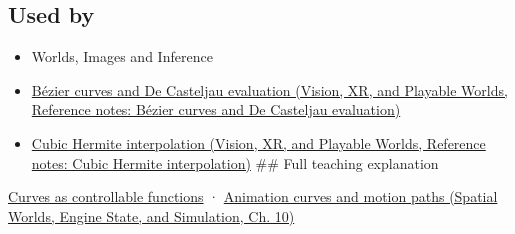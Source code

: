 \subsection{Used by}\label{appendix-f28eeec97a3d-used-by}

\begin{itemize}
\item
  {Worlds, Images and Inference}
\item
  \href{../07-Vision-XR-and-Playable-Worlds/main.pdf\#nameddest=appendix-ddbec701898c}{Bézier curves and De Casteljau evaluation (Vision, XR, and Playable Worlds, Reference notes: Bézier curves and De Casteljau evaluation)}
\item
  \href{../07-Vision-XR-and-Playable-Worlds/main.pdf\#nameddest=appendix-db3aef8f2fd6}{Cubic Hermite interpolation (Vision, XR, and Playable Worlds, Reference notes: Cubic Hermite interpolation)} \#\# Full teaching explanation
\end{itemize}

\hyperref[03-visual-computing-i-ch001-curves-as-controllable-functions]{Curves as controllable functions} · \href{../05-Spatial-Worlds-Engine-State-and-Simulation/main.pdf\#nameddest=04-visual-computing-ii-ch029-animation-curves-and-motion-paths}{Animation curves and motion paths (Spatial Worlds, Engine State, and Simulation, Ch. 10)}

